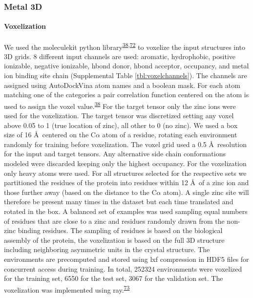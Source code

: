 \documentclass[ lineno,
  9pt]{elife}
\begin{document}
\hypertarget{metal-3d}{%
\subsubsection{Metal 3D}\label{metal-3d}}

\hypertarget{voxelization}{%
\paragraph{Voxelization}\label{voxelization}}

We used the moleculekit python library\textsuperscript{\protect\hyperlink{ref-mVGaXlum}{38},\protect\hyperlink{ref-q2gxO5bP}{72}} to voxelize the input structures into 3D grids. 8 different input channels are used: aromatic, hydrophobic, positive ionizable, negative ionizable, hbond donor, hbond acceptor, occupancy, and metal ion binding site chain (Supplemental Table \ref{tbl:voxelchannels}). The channels are assigned using AutoDockVina atom names and a boolean mask. For each atom matching one of the categories a pair correlation function centered on the atom is used to assign the voxel value.\textsuperscript{\protect\hyperlink{ref-mVGaXlum}{38}} For the target tensor only the zinc ions were used for the voxelization. The target tensor was discretized setting any voxel above 0.05 to 1 (true location of zinc), all other to 0 (no zinc). We used a box size of 16 \AA\, centered on the C$\alpha$ atom of a residue, rotating each environment randomly for training before voxelization. The voxel grid used a 0.5 \AA\, resolution for the input and target tensors. Any alternative side chain conformations modeled were discarded keeping only the highest occupancy. For the voxelization only heavy atoms were used. For all structures selected for the respective sets we partitioned the residues of the protein into residues within 12 \AA\, of a zinc ion and those further away (based on the distance to the C$\alpha$ atom). A single zinc site will therefore be present many times in the dataset but each time translated and rotated in the box. A balanced set of examples was used sampling equal numbers of residues that are close to a zinc and residues randomly drawn from the non-zinc binding residues. The sampling of residues is based on the biological assembly of the protein, the voxelization is based on the full 3D structure including neighboring asymmetric units in the crystal structure. The environments are precomputed and stored using lxf compression in HDF5 files for concurrent access during training. In total, 252324 environments were voxelized for the training set, 6550 for the test set, 3067 for the validation set. The voxelization was implemented using ray.\textsuperscript{\protect\hyperlink{ref-19MS2ZVR1}{73}}
\end{document}
